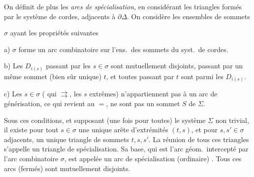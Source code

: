 \documentclass[11pt,a4paper]{article}
\begin{document}
On définit de plus les \emph{arcs de spécialisation}, en considérant les triangles formés par le système de cordes,  adjacents à $\partial\Delta$. On considère les ensembles de sommets

$\sigma$ ayant les propriétés suivantes

a)   $\sigma$ forme un arc combinatoire sur l'ens.\ des sommets du syst.\ de cordes.

b) Les $D_{i(s)}$ passant par les $s \in \sigma$ sont mutuellement disjoints, \struck{\ill{}} passant par un même sommet (bien sûr unique) $t$, et toutes   passant par $t$ sont parmi les $D_{i(s)}$.

c)  Les $s \in \sigma$ (\ill{} qui  $\rightrightarrows$, \struck{\ill{} \ill{} \ill{} \ill{}} les $s$ extrêmes) n'appartiennent pas à un arc de  générisation, ce qui revient au $=$, ne sont pas \struck{\ill{}} un sommet $S$ de $\Sigma$.

Sous ces conditions, et supposant (une fois pour toutes) le système $\Sigma$ non trivial,  il existe pour tout $s \in \sigma$ une unique arête d'extrémités $(t, s)$, et pour $s, s' \in \sigma$ adjacents, un unique triangle de  sommets $t, s, s'$. La réunion de tous ces triangles s'appelle un triangle de spécialisation. Sa base, qui est l'arc géom.\ intercepté par l'arc combinatoire $\sigma$, est appelée un arc de spécialisation (ordinaire) \struck{\ill{}}. Tous ces arcs (fermés) sont mutuellement disjoints.

\end{document}
